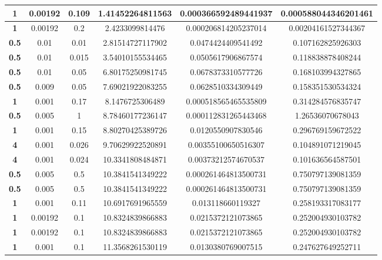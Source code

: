 \begin{table}[]
\begin{tabular}{|S|S|S|S|S|S|}
		\textbf{1}    & 0.00192 & 0.109       & 1.41452264811563   & 0.000366592489441937 & 0.000588044346201461  \\ \hline
		\textbf{1}    & 0.00192 & 0.2         & 2.4233099814476    & 0.000206814205237014 & 0.00204161527344367   \\ \hline
		\textbf{0.5}  & 0.01    & 0.01        & 2.81514727117902   & 0.0474424409541492   & 0.107162825926303     \\ \hline
		\textbf{0.5}  & 0.01    & 0.015       & 3.54010155534465   & 0.0505617906867574   & 0.118838878408244     \\ \hline
		\textbf{0.5}  & 0.01    & 0.05        & 6.80175250981745   & 0.0678373310577726   & 0.168103994327865     \\ \hline
		\textbf{0.5}  & 0.009   & 0.05        & 7.69021922083255   & 0.0628510334309449   & 0.158351530534324     \\ \hline
		\textbf{1}    & 0.001   & 0.17        & 8.1476725306489    & 0.000518565465535809 & 0.314284576835747     \\ \hline
		\textbf{0.5}  & 0.005   & 1           & 8.78460177236147   & 0.000112831265443468 & 1.26536070678043      \\ \hline
		\textbf{1}    & 0.001   & 0.15        & 8.80270425389726   & 0.0120550907830546   & 0.296769159672522     \\ \hline
		\textbf{4}    & 0.001   & 0.026       & 9.70629922520891   & 0.00355100650516307  & 0.104891071219045     \\ \hline
		\textbf{4}    & 0.001   & 0.024       & 10.3341808484871   & 0.00373212574670537  & 0.101636564587501     \\ \hline
		\textbf{0.5}  & 0.005   & 0.5         & 10.3841541349222   & 0.000261464813500731 & 0.750797139081359     \\ \hline
		\textbf{0.5}  & 0.005   & 0.5         & 10.3841541349222   & 0.000261464813500731 & 0.750797139081359     \\ \hline
		\textbf{1}    & 0.001   & 0.11        & 10.6917691965559   & 0.013118660119327    & 0.258193317083177     \\ \hline
		\textbf{1}    & 0.00192 & 0.1         & 10.8324839866883   & 0.0215372121073865   & 0.252004930103782     \\ \hline
		\textbf{1}    & 0.00192 & 0.1         & 10.8324839866883   & 0.0215372121073865   & 0.252004930103782     \\ \hline
		\textbf{1}    & 0.001   & 0.1         & 11.3568261530119   & 0.0130380769007515   & 0.247627649252711     \\ \hline

\end{tabular}
\end{table}
